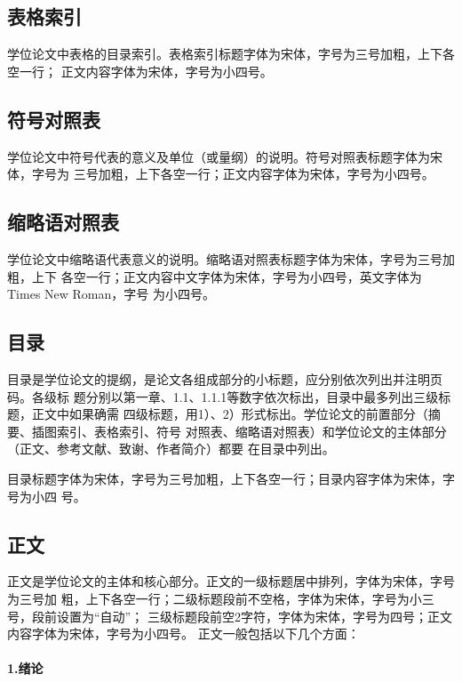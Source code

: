 \subsection{表格索引}

学位论文中表格的目录索引。表格索引标题字体为宋体，字号为三号加粗，上下各空一行；
正文内容字体为宋体，字号为小四号。

\subsection{符号对照表}

学位论文中符号代表的意义及单位（或量纲）的说明。符号对照表标题字体为宋体，字号为
三号加粗，上下各空一行；正文内容字体为宋体，字号为小四号。

\subsection{缩略语对照表}

学位论文中缩略语代表意义的说明。缩略语对照表标题字体为宋体，字号为三号加粗，上下
各空一行；正文内容中文字体为宋体，字号为小四号，英文字体为Times New Roman，字号
为小四号。

\subsection{目录}

目录是学位论文的提纲，是论文各组成部分的小标题，应分别依次列出并注明页码。各级标
题分别以第一章、1.1、1.1.1等数字依次标出，目录中最多列出三级标题，正文中如果确需
四级标题，用1）、2）形式标出。学位论文的前置部分（摘要、插图索引、表格索引、符号
对照表、缩略语对照表）和学位论文的主体部分（正文、参考文献、致谢、作者简介）都要
在目录中列出。

目录标题字体为宋体，字号为三号加粗，上下各空一行；目录内容字体为宋体，字号为小四
号。

\subsection{正文}

正文是学位论文的主体和核心部分。正文的一级标题居中排列，字体为宋体，字号为三号加
粗，上下各空一行；二级标题段前不空格，字体为宋体，字号为小三号，段前设置为“自动”；
三级标题段前空2字符，字体为宋体，字号为四号；正文内容字体为宋体，字号为小四号。
正文一般包括以下几个方面：

\paragraph{1.绪论}

